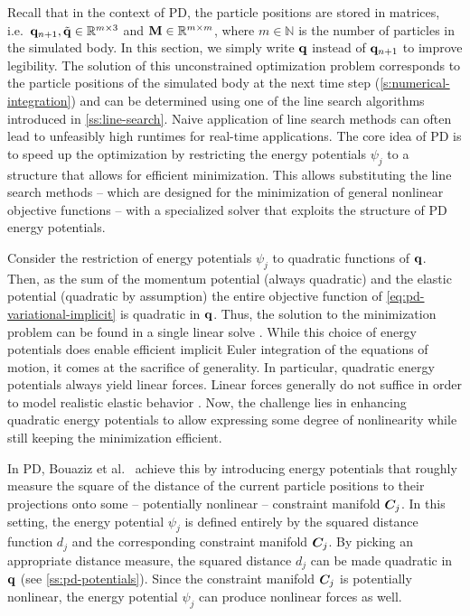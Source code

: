 \noindent Recall that in the context of PD, the particle positions are stored in matrices, i.e.\ $\mathbf{q}_{n+1}, \tilde{\mathbf{q}} \in 
\mathbb{R}^{m \times 3}$ and $\mathbf{M} \in \mathbb{R}^{m \times m}$, where $m \in \mathbb{N}$ is the number of particles in the simulated
body. In this section, we simply write $\mathbf{q}$ instead of $\mathbf{q}_{n+1}$ to improve legibility. The solution of this unconstrained 
optimization problem corresponds to the particle positions of the simulated body at the next time
step (\cref{s:numerical-integration}) and can be determined using one of the line search algorithms introduced in \cref{ss:line-search}.
Naive application of line search methods can often lead to unfeasibly high runtimes for real-time applications. The core idea of PD
is to speed up the optimization by restricting the energy potentials $\psi_j$ to a structure that allows for efficient minimization.
This allows substituting the line search methods -- which are designed for the minimization of general nonlinear objective functions 
-- with a specialized solver that exploits the structure of PD energy potentials. 

Consider the restriction of energy potentials $\psi_j$ to quadratic functions of $\mathbf{q}$. Then, as the sum of the momentum potential 
(always quadratic) and the elastic potential (quadratic by assumption) the entire objective function of \autoref{eq:pd-variational-implicit} 
is quadratic in $\mathbf{q}$. Thus, the solution to the minimization problem can be found in a single linear solve \cite{nocedal2006}. 
While this choice
of energy potentials does enable efficient implicit Euler integration of the equations of motion, it comes at the sacrifice of generality.
In particular, quadratic energy potentials always yield linear forces. Linear forces generally do not suffice in order to model realistic
elastic behavior \cite{wang2011}. Now, the challenge lies in enhancing quadratic energy potentials to allow expressing some degree
of nonlinearity while still keeping the minimization efficient. 

In PD, Bouaziz et al.\ \cite{bouaziz2014} achieve this by introducing energy potentials that roughly measure the square of the
distance of the current particle positions to their projections onto some -- potentially nonlinear -- constraint manifold $\bm{C}_j$. 
In this setting, the energy potential $\psi_j$ is defined entirely by the squared distance function $d_j$ and the corresponding constraint 
manifold $\bm{C}_j$. By picking an appropriate distance measure, the squared distance $d_j$ can be made quadratic in $\mathbf{q}$ 
(see \cref{ss:pd-potentials}). Since the constraint manifold $\bm{C}_j$ is potentially nonlinear, the energy potential 
$\psi_j$ can produce nonlinear forces as well. 

